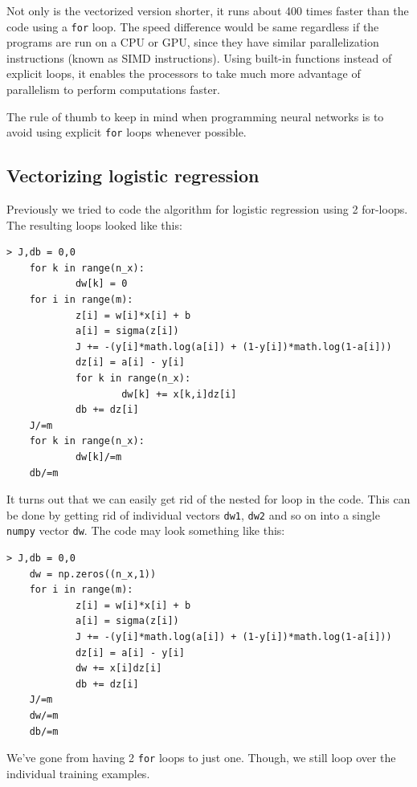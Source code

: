 \documentclass{article}[a4paper,12pt]
\theoremstyle{definition}
\begin{document}
Not only is the vectorized version shorter, it runs about 400 times faster than the code using a \texttt{for} loop. The speed difference would be same regardless if the programs are run on a CPU or GPU, since they have similar parallelization instructions (known as SIMD instructions). Using built-in functions instead of explicit loops, it enables the processors to take much more advantage of parallelism to perform computations faster.
\vspace{6pt}

The rule of thumb to keep in mind when programming neural networks is to avoid using explicit \texttt{for} loops whenever possible.
\subsection{Vectorizing logistic regression}
Previously we tried to code the algorithm for logistic regression using 2 for-loops. The resulting loops looked like this:
\begin{Verbatim}[tabsize=2]
> J,db = 0,0
	for k in range(n_x):
			dw[k] = 0
	for i in range(m):
			z[i] = w[i]*x[i] + b
			a[i] = sigma(z[i])
			J += -(y[i]*math.log(a[i]) + (1-y[i])*math.log(1-a[i]))
			dz[i] = a[i] - y[i]
			for k in range(n_x):
					dw[k] += x[k,i]dz[i]
			db += dz[i]
	J/=m
	for k in range(n_x):
			dw[k]/=m
	db/=m
\end{Verbatim}
It turns out that we can easily get rid of the nested for loop in the code. This can be done by getting rid of individual vectors \texttt{dw1}, \texttt{dw2} and so on into a single \texttt{numpy} vector \texttt{dw}. The code may look something like this: 
\begin{Verbatim}[tabsize=2]
> J,db = 0,0
	dw = np.zeros((n_x,1))
	for i in range(m):
			z[i] = w[i]*x[i] + b
			a[i] = sigma(z[i])
			J += -(y[i]*math.log(a[i]) + (1-y[i])*math.log(1-a[i]))
			dz[i] = a[i] - y[i]
			dw += x[i]dz[i]
			db += dz[i]
	J/=m
	dw/=m
	db/=m
\end{Verbatim}
We've gone from having 2 \texttt{for} loops to just one. Though, we still loop over the individual training examples.
\end{document}
